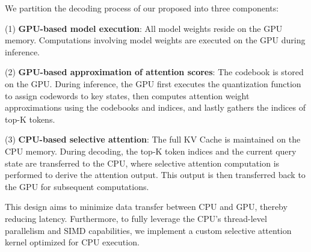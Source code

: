 We partition the decoding process of our proposed {\name} into three components:  

\noindent (1) \textbf{GPU-based model execution}: All model weights reside on the GPU memory. 
Computations involving model weights are executed on the GPU during inference.  

\noindent(2) \textbf{GPU-based approximation of attention scores}: The codebook is stored on the GPU. 
During inference, the GPU first executes the quantization function to assign codewords to key states, then computes attention weight approximations using the codebooks and indices, and lastly gathers the indices of top-K tokens.

\noindent(3) \textbf{CPU-based selective attention}: The full KV Cache is maintained on the CPU memory. 
During decoding, the top-K token indices and the current query state are transferred to the CPU, where selective attention computation is performed to derive the attention output. 
This output is then transferred back to the GPU for subsequent computations.

This design aims to minimize data transfer between CPU and GPU, thereby reducing latency. 
Furthermore, to fully leverage the CPU's thread-level parallelism and SIMD capabilities, we implement a custom selective attention kernel optimized for CPU execution.